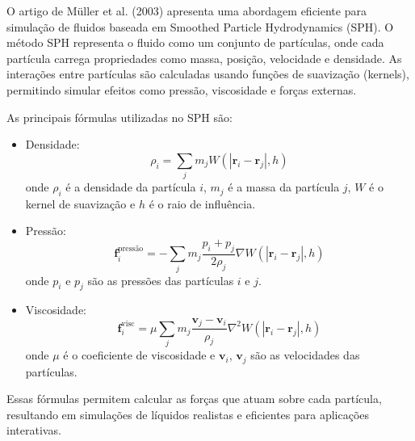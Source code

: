 O artigo de Müller et al. (2003) \cite{muller2003} apresenta uma abordagem eficiente para simulação de fluidos baseada em Smoothed Particle Hydrodynamics (SPH). O método SPH representa o fluido como um conjunto de partículas, onde cada partícula carrega propriedades como massa, posição, velocidade e densidade. As interações entre partículas são calculadas usando funções de suavização (kernels), permitindo simular efeitos como pressão, viscosidade e forças externas.

As principais fórmulas utilizadas no SPH são:

\begin{itemize}
  \item Densidade: $$
\rho_i = \sum_j m_j W(|\mathbf{r}_i - \mathbf{r}_j|, h)
$$
onde $\rho_i$ é a densidade da partícula $i$, $m_j$ é a massa da partícula $j$, $W$ é o kernel de suavização e $h$ é o raio de influência.

\item Pressão: $$
\mathbf{f}_i^{\text{pressão}} = -\sum_j m_j \frac{p_i + p_j}{2 \rho_j} \nabla W(|\mathbf{r}_i - \mathbf{r}_j|, h)
$$
onde $p_i$ e $p_j$ são as pressões das partículas $i$ e $j$.

\item Viscosidade: $$
\mathbf{f}_i^{\text{visc}} = \mu \sum_j m_j \frac{\mathbf{v}_j - \mathbf{v}_i}{\rho_j} \nabla^2 W(|\mathbf{r}_i - \mathbf{r}_j|, h) $$ onde $\mu$ é o coeficiente de viscosidade e $\mathbf{v}_i$, $\mathbf{v}_j$ são as velocidades das partículas.
\end{itemize}

Essas fórmulas permitem calcular as forças que atuam sobre cada partícula, resultando em simulações de líquidos realistas e eficientes para aplicações interativas.


